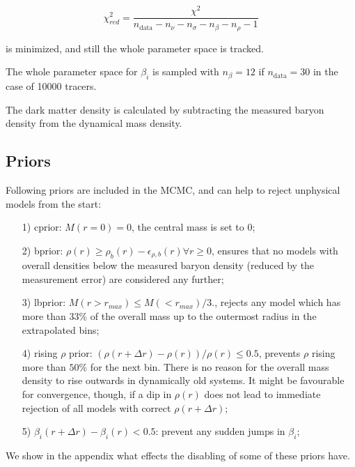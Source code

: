 
\begin{equation}
\chi^2_{red} = \frac{\chi^2}{n_{\text{data}} - n_\nu - n_\sigma - n_\beta - n_\rho -1}
\end{equation}

is minimized, and still the whole parameter space is tracked.

The whole parameter space for $\beta_i$ is sampled with $n_\beta=12$
if $n_{\text{data}}=30$ in the case of 10000 tracers.

The dark matter density is calculated by subtracting the measured
baryon density from the dynamical mass density.

\subsection{Priors}
Following priors are included in the MCMC, and can help to reject
unphysical models from the start:

\begin{enumerate}
\item[1)] cprior: $M(r=0) = 0$, the central mass is set to 0;

\item[2)] bprior: $\rho(r) \geq \rho_b(r)-\epsilon_{\rho,b}(r) \forall
  r\geq0$, ensures that no models with overall densities below the
  measured baryon density (reduced by the measurement error) are
  considered any further;

\item[3)] lbprior: $M(r>r_{max}) \leq M(<r_{max})/3.$, rejects any
  model which has more than $33\%$ of the overall mass up to the
  outermost radius in the extrapolated bins;

\item[4)] rising $\rho$ prior: $(\rho(r+\Delta r)-\rho(r))/\rho(r)\leq
  0.5$, prevents $\rho$ rising more than $50\%$ for the next
  bin. There is no reason for the overall mass density to rise
  outwards in dynamically old systems. It might be favourable for
  convergence, though, if a dip in $\rho(r)$ does not lead to
  immediate rejection of all models with correct $\rho(r+\Delta r)$;

\item[5)] $\beta_i(r+\Delta r)-\beta_i(r) < 0.5$: prevent any sudden
  jumps in $\beta_i$;
\end{enumerate}

We show in the appendix what effects the disabling of some of these
priors have.
